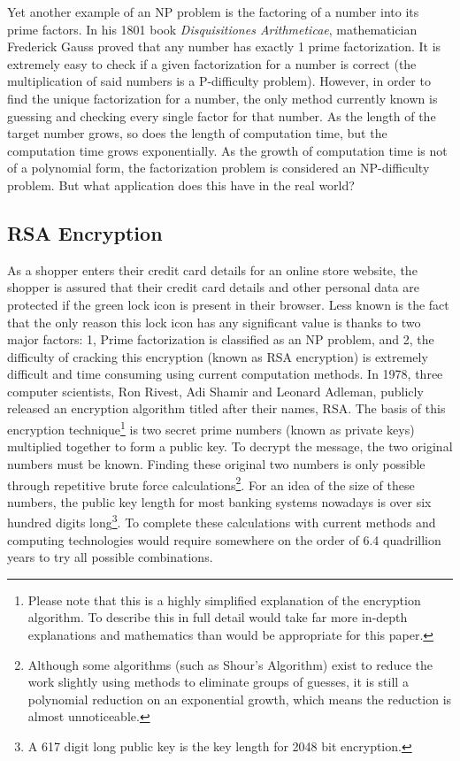 \documentclass[10pt,journal,compsoc]{IEEEtran}
\begin{document}
Yet another example of an NP problem is the factoring of a number into its prime factors. In his 1801 book \textit{Disquisitiones Arithmeticae}, mathematician Frederick Gauss proved that any number has exactly 1 prime factorization. It is extremely easy to check if a given factorization for a number is correct (the multiplication of said numbers is a P-difficulty problem). However, in order to find the unique factorization for a number, the only method currently known is guessing and checking every single factor for that number. As the length of the target number grows, so does the length of computation time, but the computation time grows exponentially. As the growth of computation time is not of a polynomial form, the factorization problem is considered an NP-difficulty problem. But what application does this have in the real world?

\subsection{RSA Encryption}
As a shopper enters their credit card details for an online store website, the shopper is assured that their credit card details and other personal data are protected if the green lock icon is present in their browser. Less known is the fact that the only reason this lock icon has any significant value is thanks to two major factors: 1, Prime factorization is classified as an NP problem, and 2, the difficulty of cracking this encryption (known as RSA encryption) is extremely difficult and time consuming using current computation methods. In 1978, three computer scientists, Ron Rivest, Adi Shamir and Leonard Adleman, publicly released an encryption algorithm titled after their names, RSA. The basis of this encryption technique\footnote{Please note that this is a highly simplified explanation of the encryption algorithm. To describe this in full detail would take far more in-depth explanations and mathematics than would be appropriate for this paper.} is two secret prime numbers (known as private keys) multiplied together to form a public key. To decrypt the message, the two original numbers must be known. Finding these original two numbers is only possible through repetitive brute force calculations\footnote{Although  some algorithms (such as Shour's Algorithm) exist to reduce the work slightly using methods to eliminate groups of guesses, it is still a polynomial reduction on an exponential growth, which means the reduction is almost unnoticeable.}. For an idea of the size of these numbers, the public key length for most banking systems nowadays is over six hundred digits long\footnote{A 617 digit long public key is the key length for 2048 bit encryption.}. To complete these calculations with current  methods and computing technologies  would require somewhere on the order of 6.4 quadrillion years to try all possible combinations. 
\end{document}
